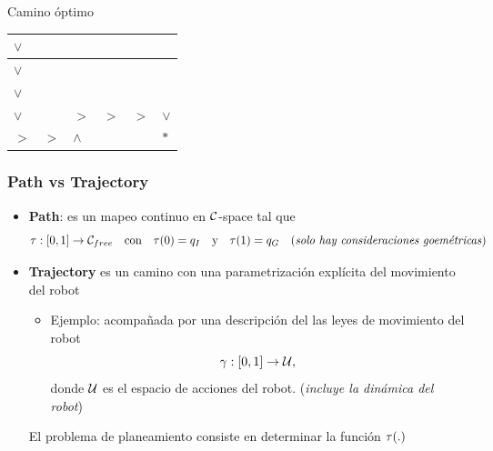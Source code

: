\begin{frame}
\begin{footnotesize}
        \begin{center}
            Camino óptimo\\
            
            \begin{tabularx}{5cm}{|X|X|X|X|X|X|}	
                \hline
                $\vee$ & \cellcolor{black} &  & & & \\
                \hline
                $\vee$ & \cellcolor{black} &  & & & \\
                \hline
                $\vee$ & \cellcolor{black} &  & & & \\
                \hline
                $\vee$ & \cellcolor{black} & $>$ & $>$ & $>$ & $\vee$\\
                \hline
                $>$ & $>$ & $\wedge$ & \cellcolor{black} & & $*$ \\
                \hline
            \end{tabularx}
        \end{center}
    \end{footnotesize}
\end{frame}


\begin{frame}
    \frametitle{Path vs Trajectory}
    
    \begin{itemize}
        \item {\bf Path}: es un mapeo continuo en $\mathcal{C}$-space tal que
        \begin{equation*}
            \tau : [0,1] \rightarrow \mathcal{C}_{free} \quad \text{con} \quad \tau(0) = q_{I} \quad \text{y} \quad  \tau(1) = q_{G} \quad \text{(\emph{solo hay consideraciones goemétricas})}
        \end{equation*} 
        \item {\bf Trajectory} es un camino con una parametrización explícita del movimiento del robot
        \begin{itemize}
            \item Ejemplo: acompañada por una descripción del las leyes de movimiento del robot
            \begin{equation*}
                \gamma : [0, 1] \rightarrow \mathcal{U},
            \end{equation*}
            donde $\mathcal{U}$ es el espacio de acciones del robot. (\emph{incluye la dinámica del robot})
        \end{itemize}
        \vspace{3em}
        \begin{center}
            \alert{El problema de planeamiento consiste en determinar la función $\tau(.)$}  
        \end{center}
    \end{itemize}
\end{frame}

